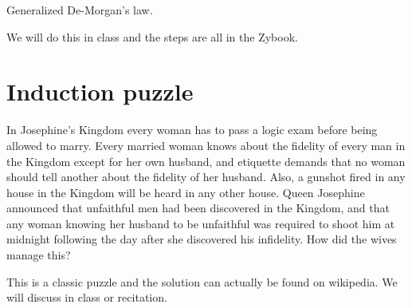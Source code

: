 \documentclass[12pt]{article}
\begin{document}
Generalized De-Morgan's law.

We will do this in class and the steps are all in the Zybook.

\section*{Induction puzzle}

 In Josephine's Kingdom every woman has to pass a logic exam before being allowed to marry. Every married woman knows about the fidelity of every man in the Kingdom except for her own husband, and etiquette demands that no woman should tell another about the fidelity of her husband. Also, a gunshot fired in any house in the Kingdom will be heard in any other house. Queen Josephine announced that unfaithful men had been discovered in the Kingdom, and that any woman knowing her husband to be unfaithful was required to shoot him at midnight following the day after she discovered his infidelity. How did the wives manage this?
 
This is a classic puzzle and the solution can actually be found on wikipedia. We will discuss in class or recitation.
\end{document}
